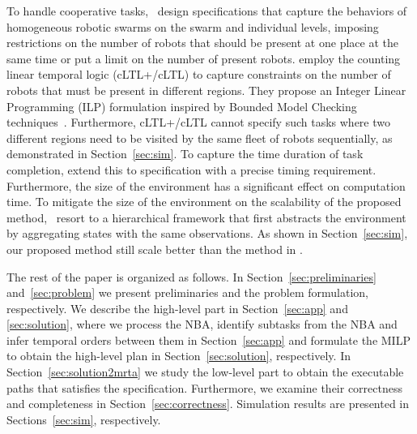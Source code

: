 \documentclass[Afour,sageh,times]{sagej}
\begin{document}
To handle cooperative tasks,~\cite{moarref2017decentralized} design specifications that capture the behaviors of homogeneous robotic swarms on the swarm and individual levels,  imposing restrictions on the number of robots that should be present at one place at the same time or put a limit on the number of present robots. \cite{sahin2017provably,sahin2017synchronous,sahin2019multirobot} employ the counting linear temporal logic (cLTL+/cLTL) to capture constraints on the number of robots that must be present in different regions. They propose an Integer Linear Programming (ILP) formulation inspired by Bounded Model Checking techniques~\citep{biere2006linear}.  Furthermore, cLTL+/cLTL cannot specify such tasks where two different regions need to be visited by the same fleet of robots sequentially, as demonstrated in Section~\ref{sec:sim}. To capture the time duration of task completion, \cite{JoLeVaSaSeTrBe-ISRR-2019} extend this to specification with a precise timing requirement.  Furthermore, the size of the environment has a significant effect on computation time. To mitigate the size of the environment on the scalability of the proposed method,~\cite{sahin2019multi} resort to a hierarchical framework that first abstracts the environment by aggregating states with the same observations. As shown in Section~\ref{sec:sim}, our proposed method still scale better than the method in \cite{sahin2019multi}.

The rest of the paper is organized as follows. %
In Section~\ref{sec:preliminaries} and~\ref{sec:problem} we present preliminaries and the problem formulation, respectively. We describe the high-level part in  Section~\ref{sec:app} and \ref{sec:solution}, where we process the NBA, identify subtasks from the NBA and infer temporal orders between them in Section~\ref{sec:app} and formulate the MILP to obtain the high-level plan in Section~\ref{sec:solution}, respectively. In Section~\ref{sec:solution2mrta} we study the low-level part to obtain the executable paths that satisfies the specification.  Furthermore, we examine their correctness and completeness  in Section~\ref{sec:correctness}. Simulation results are presented in Sections~\ref{sec:sim}, respectively.
\end{document}
